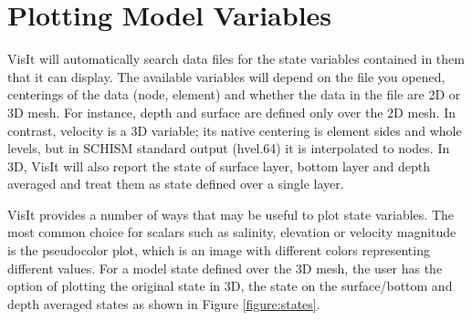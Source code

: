 \documentclass[12pt]{report}
\begin{document}
  \section{Plotting Model Variables}\label{subsection:viewstate}
     VisIt will automatically search data files for the state variables contained in them that it can display. 
		 The available variables will depend on the file you opened, centerings of the data (node, element) 
		 and whether the data in the file are 2D or 3D mesh. For instance, depth and surface are defined only over the 2D mesh.
		 In contrast, velocity is a 3D variable; its native centering is element sides and whole levels, but 
		 in SCHISM standard output (hvel.64) it is interpolated to nodes. In 3D, VisIt will also report the state of surface layer, bottom layer and
     depth averaged and treat them as state defined over a single layer.
     
     VisIt provides a number of ways that may be useful to plot state variables. The most common choice for
		 scalars such as salinity, elevation or velocity magnitude is the pseudocolor plot, which is an image with different colors
		 representing different values. For a model state defined over the 3D mesh, the user has the option of plotting the 
		 original state in 3D, the state on the surface/bottom and depth averaged states as shown in Figure \ref{figure:states}.
     
\end{document}
